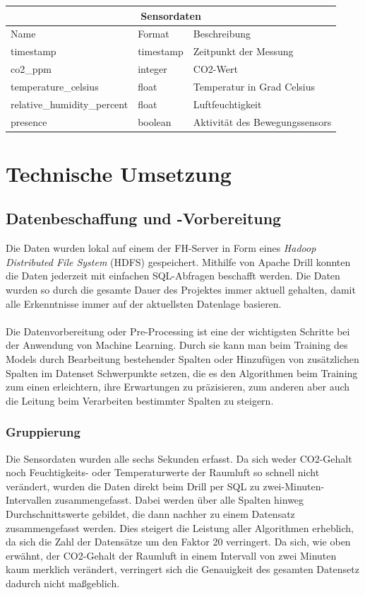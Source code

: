 \begin{tabular}{|p{4.5cm}||p{3cm}|p{7cm}|}
    \hline
    \multicolumn{3}{|c|}{Sensordaten} \\
    \hline
    Name&Format &Beschreibung\\
    \hline
    timestamp&timestamp&Zeitpunkt der Messung\\
    co2\_ppm&integer&CO2-Wert\\
    temperature\_celsius&float&Temperatur in Grad Celsius\\
    relative\_humidity\_percent&float&Luftfeuchtigkeit\\
    presence&boolean&Aktivität des Bewegungssensors\\
    \hline
\end{tabular}     

\chapter{Technische Umsetzung}

\section{Datenbeschaffung und -Vorbereitung}
Die Daten wurden lokal auf einem der FH-Server in Form eines \textit{Hadoop Distributed File System} (HDFS) 
gespeichert. Mithilfe von Apache Drill konnten die Daten jederzeit mit einfachen SQL-Abfragen beschafft werden. 
Die Daten wurden so durch die gesamte Dauer des Projektes immer aktuell gehalten, damit alle Erkenntnisse 
immer auf der aktuellsten Datenlage basieren.
\\\\
Die Datenvorbereitung oder Pre-Processing ist eine der wichtigsten Schritte bei der Anwendung von Machine 
Learning. Durch sie kann man beim Training des Models durch Bearbeitung bestehender Spalten oder Hinzufügen 
von zusätzlichen Spalten im Datenset Schwerpunkte setzen, die es den Algorithmen beim Training zum einen 
erleichtern, ihre Erwartungen zu präzisieren, zum anderen aber auch die Leitung beim Verarbeiten bestimmter 
Spalten zu steigern.
\subsection{Gruppierung}
Die Sensordaten wurden alle sechs Sekunden erfasst. Da sich weder CO2-Gehalt noch Feuchtigkeits- oder 
Temperaturwerte der Raumluft so schnell nicht verändert, wurden die Daten direkt beim Drill per SQL zu 
zwei-Minuten-Intervallen zusammengefasst. Dabei werden über alle Spalten hinweg Durchschnittswerte gebildet, 
die dann nachher zu einem Datensatz zusammengefasst werden. 
Dies steigert die Leistung aller Algorithmen erheblich, da sich die Zahl der 
Datensätze um den Faktor 20 verringert. Da sich, wie oben erwähnt, der CO2-Gehalt der Raumluft in einem 
Intervall von zwei Minuten kaum merklich verändert, verringert sich die Genauigkeit des gesamten Datensetz 
dadurch nicht maßgeblich.
